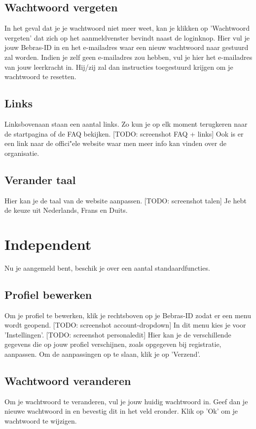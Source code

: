 \documentclass[]{article}
\begin{document}
\subsection{Wachtwoord vergeten}
In het geval dat je je wachtwoord niet meer weet, kan je klikken op 'Wachtwoord vergeten' dat zich op het aanmeldvenster bevindt naast de loginknop. Hier vul je jouw Bebras-ID in en het e-mailadres waar een nieuw wachtwoord naar gestuurd zal worden. Indien je zelf geen e-mailadres zou hebben, vul je hier het e-mailadres van jouw leerkracht in. Hij/zij zal dan instructies toegestuurd krijgen om je wachtwoord te resetten.

\subsection{Links}
Linksbovenaan staan een aantal links. Zo kun je op elk moment terugkeren naar de startpagina of de FAQ bekijken. [TODO: screenshot FAQ + links] Ook is er een link naar de offici"ele website waar men meer info kan vinden over de organisatie.

\subsection{Verander taal}
Hier kan je de taal van de website aanpassen. [TODO: screenshot talen] Je hebt de keuze uit Nederlands, Frans en Duits.

\section{Independent}

Nu je aangemeld bent, beschik je over een aantal standaardfuncties.

\subsection{Profiel bewerken}
Om je profiel te bewerken, klik je rechtsboven op je Bebras-ID zodat er een menu wordt geopend. [TODO: screenshot account-dropdown] In dit menu kies je voor 'Instellingen'. [TODO: screenshot personaledit] Hier kan je de verschillende gegevens die op jouw profiel verschijnen, zoals opgegeven bij registratie, aanpassen. Om de aanpassingen op te slaan, klik je op 'Verzend'.

\subsection{Wachtwoord veranderen}
Om je wachtwoord te veranderen, vul je jouw huidig wachtwoord in. Geef dan je nieuwe wachtwoord in en bevestig dit in het veld eronder. Klik op 'Ok' om je wachtwoord te wijzigen.
\end{document}
